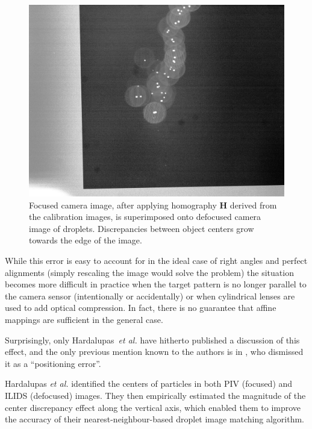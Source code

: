 \documentclass[11.5pt,oneside]{book}
\begin{document}
\begin{figure}
    \centering
    \includegraphics[height=0.45\textheight]{img/orb/drop-calibration-off.jpg}
    \caption{Focused camera image, after applying homography $\mathbf{H}$
        derived from the calibration images, is superimposed onto
    defocused camera image of droplets. Discrepancies between object centers
grow towards the edge of the image.}
    \label{fig:drop-calibration-off}
\end{figure}

While this error is easy to account for in the ideal case of right angles and
perfect alignments (simply rescaling the image would solve the problem) the
situation becomes more difficult in practice when the target pattern is no longer
parallel to the camera sensor (intentionally or accidentally) or when
cylindrical lenses are used to add optical compression. In fact, there is no
guarantee that affine mappings are sufficient in the general case.

Surprisingly, only Hardalupas~\emph{et al.} \cite{Hardalupas10, Hardalupas10a}
have hitherto published a discussion of this effect, and the only previous
mention known to the authors is in \citet{Kurosawa02}, who dismissed it as a
``positioning error''.

Hardalupas \emph{et al.} identified the centers of particles in both PIV
(focused) and ILIDS (defocused) images. They then empirically estimated the
magnitude of the center discrepancy effect along the vertical axis, which
enabled them to improve the accuracy of their nearest-neighbour-based droplet
image matching algorithm.
\end{document}

